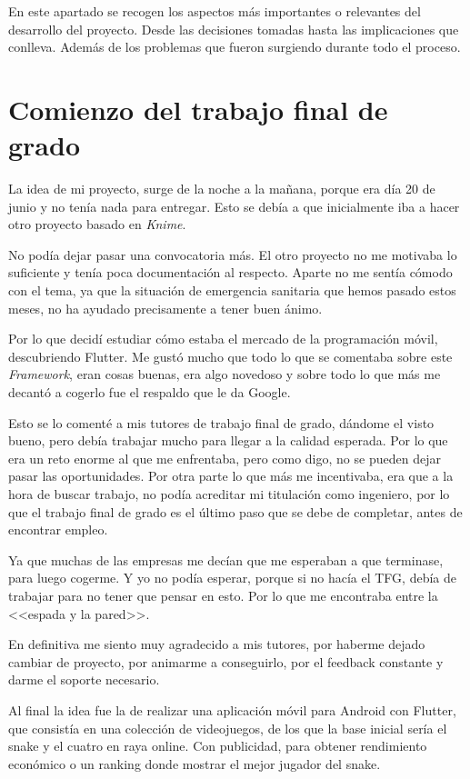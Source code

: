 
En este apartado se recogen los aspectos más importantes o relevantes del desarrollo del proyecto. Desde las decisiones tomadas hasta las implicaciones que conlleva. Además de los problemas que fueron surgiendo durante todo el proceso.

\section{Comienzo del trabajo final de grado}
La idea de mi proyecto, surge de la noche a la mañana, porque era día 20 de junio y no tenía nada para entregar. Esto se debía a que inicialmente iba a hacer otro proyecto basado en \emph{Knime}.

No podía dejar pasar una convocatoria más. El otro proyecto no me motivaba lo suficiente y tenía poca documentación al respecto. Aparte no me sentía cómodo con el tema, ya que la situación de emergencia sanitaria que hemos pasado estos meses, no ha ayudado precisamente a tener buen ánimo.

Por lo que decidí estudiar cómo estaba el mercado de la programación móvil, descubriendo Flutter. Me gustó mucho que todo lo que se comentaba sobre este \emph{Framework}, eran cosas buenas, era algo novedoso y sobre todo lo que más me decantó a cogerlo fue el respaldo que le da Google.

Esto se lo comenté a mis tutores de trabajo final de grado, dándome el visto bueno, pero debía trabajar mucho para llegar a la calidad esperada. Por lo que era un reto enorme al que me enfrentaba, pero como digo, no se pueden dejar pasar las oportunidades. Por otra parte lo que más me incentivaba, era que a la hora de buscar trabajo, no podía acreditar mi titulación como ingeniero, por lo que el trabajo final de grado es el último paso que se debe de completar, antes de encontrar empleo.

Ya que muchas de las empresas me decían que me esperaban a que terminase, para luego cogerme. Y yo no podía esperar, porque si no hacía el TFG, debía de trabajar para no tener que pensar en esto. Por lo que me encontraba entre la <<espada y la pared>>.

En definitiva me siento muy agradecido a mis tutores, por haberme dejado cambiar de proyecto, por animarme a conseguirlo, por el feedback constante y darme el soporte necesario.

Al final la idea fue la de realizar una aplicación móvil para Android con Flutter, que consistía en una colección de videojuegos, de los que la base inicial sería el snake y el cuatro en raya online. Con publicidad, para obtener rendimiento económico o un ranking donde mostrar el mejor jugador del snake.

